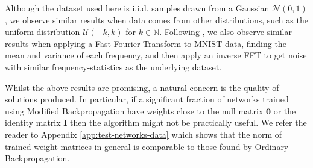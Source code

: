 \documentclass{article}
\theoremstyle{plain}
\theoremstyle{definition}
\theoremstyle{remark}
\newcommand{\vI}{\mathbf{I}}
\begin{document}
Although the dataset used here is i.i.d. samples drawn from a Gaussian ${\mathcal{N}(0, 1)}$, we observe similar results when data comes from other distributions, such as the uniform distribution ${\mathcal{U}(-k, k)}$ for ${k \in \mathbb{N}}$. Following \citealt{shocher-ign}, we also observe similar results when applying a Fast Fourier Transform to MNIST data, finding the mean and variance of each frequency, and then apply an inverse FFT to get noise with similar frequency-statistics as the underlying dataset.

Whilst the above results are promising, a natural concern is the quality of solutions produced. In particular, if a significant fraction of networks trained using Modified Backpropagation have weights close to the null matrix $\bm{0}$ or the identity matrix $\vI$ then the algorithm might not be practically useful. We refer the reader to Appendix \ref{app:test-networks-data} which shows that the norm of trained weight matrices in general is comparable to those found by Ordinary Backpropagation.

\end{document}
